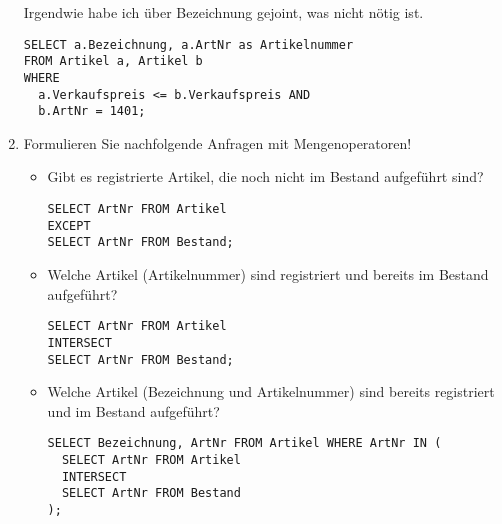\documentclass{lehramt-informatik-aufgabe}
\begin{document}
\begin{enumerate}
\begin{antwort}[muster]
Irgendwie habe ich über Bezeichnung gejoint, was nicht nötig ist.
\begin{verbatim}
SELECT a.Bezeichnung, a.ArtNr as Artikelnummer
FROM Artikel a, Artikel b
WHERE
  a.Verkaufspreis <= b.Verkaufspreis AND
  b.ArtNr = 1401;
\end{verbatim}
\end{antwort}


\item Formulieren Sie nachfolgende Anfragen mit Mengenoperatoren!

\begin{itemize}


\item Gibt es registrierte Artikel, die noch nicht im Bestand aufgeführt
sind?

\begin{antwort}[muster]
\begin{verbatim}
SELECT ArtNr FROM Artikel
EXCEPT
SELECT ArtNr FROM Bestand;
\end{verbatim}
\end{antwort}


\item Welche Artikel (Artikelnummer) sind registriert und bereits im
Bestand aufgeführt?

\begin{antwort}[muster]
\begin{verbatim}
SELECT ArtNr FROM Artikel
INTERSECT
SELECT ArtNr FROM Bestand;
\end{verbatim}
\end{antwort}


\item Welche Artikel (Bezeichnung und Artikelnummer) sind bereits
registriert und im Bestand aufgeführt?

\begin{antwort}[muster]
\begin{verbatim}
SELECT Bezeichnung, ArtNr FROM Artikel WHERE ArtNr IN (
  SELECT ArtNr FROM Artikel
  INTERSECT
  SELECT ArtNr FROM Bestand
);
\end{verbatim}
\end{antwort}
\end{itemize}



\end{enumerate}
\end{document}
